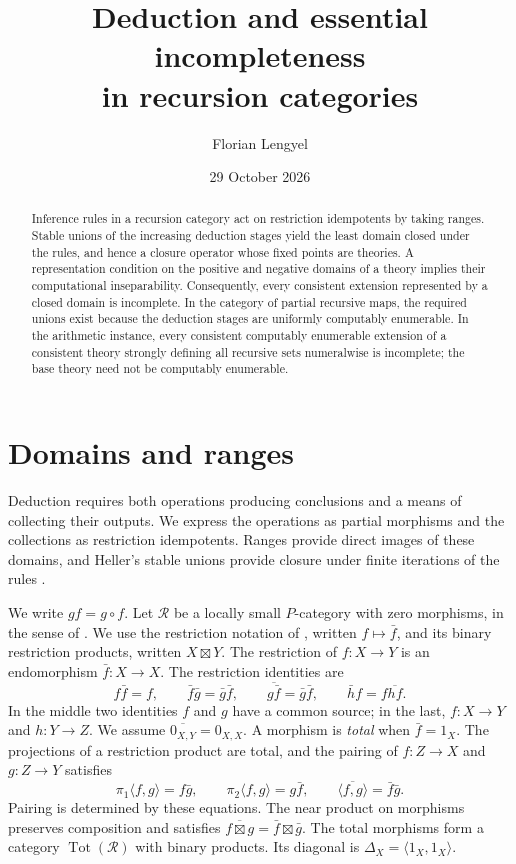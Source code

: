 \documentclass[11pt]{article}
\title{Deduction and essential incompleteness\protect\\in recursion categories}
\author{Florian Lengyel}
\date{29 October 2026}
\theoremstyle{definition}
\newcommand{\R}{\mathscr R}
\newcommand{\Tot}{\operatorname{Tot}}
\begin{document}
\maketitle

\begin{abstract}
Inference rules in a recursion category act on restriction idempotents by
taking ranges. Stable unions of the increasing deduction stages yield the
least domain closed under the rules, and hence a closure operator whose fixed
points are theories. A representation condition on the positive and negative
domains of a theory implies their computational inseparability. Consequently,
every consistent extension represented by a closed domain is incomplete.
In the category of partial recursive maps, the required unions exist because
the deduction stages are uniformly computably enumerable. In the arithmetic
instance, every consistent computably enumerable extension of a consistent
theory strongly defining all recursive sets numeralwise is incomplete; the
base theory need not be computably enumerable.
\end{abstract}

\section{Domains and ranges}

Deduction requires both operations producing conclusions and a means of
collecting their outputs. We express the operations as partial morphisms and
the collections as restriction idempotents. Ranges provide direct images of
these domains, and Heller's stable unions provide closure under finite
iterations of the rules \cite{Heller}.

We write $gf=g\circ f$. Let $\R$ be a locally small $P$-category with zero
morphisms, in the sense of \cite{Heller}. We use the restriction notation
of \cite{RestrictionI},
written $f\mapsto\bar f$, and its binary restriction products, written
$X\boxtimes Y$. The restriction of $f:X\to Y$ is an endomorphism
$\bar f:X\to X$. The restriction identities are
\[
 f\bar f=f,\qquad
 \bar f\bar g=\bar g\bar f,\qquad
 \overline{g\bar f}=\bar g\bar f,\qquad
 \bar h f=f\overline{hf}.
\]
In the middle two identities $f$ and $g$ have a common source; in the last,
$f:X\to Y$ and $h:Y\to Z$. We assume $\overline{0_{X,Y}}=0_{X,X}$.
A morphism is \emph{total} when $\bar f=1_X$. The projections of a restriction
product are total, and the pairing of $f:Z\to X$ and $g:Z\to Y$ satisfies
\[
 \pi_1\langle f,g\rangle=f\bar g,\qquad
 \pi_2\langle f,g\rangle=g\bar f,\qquad
 \overline{\langle f,g\rangle}=\bar f\bar g.
\]
Pairing is determined by these equations. The near product on morphisms
preserves composition and satisfies
$\overline{f\boxtimes g}=\bar f\boxtimes\bar g$.
The total morphisms form a category $\Tot(\R)$ with binary products.
Its diagonal is $\Delta_X=\langle1_X,1_X\rangle$.
\end{document}
